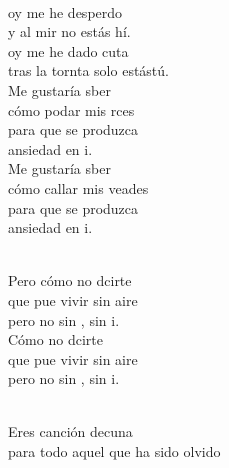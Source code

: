 \documentclass[12pt]{article}
\begin{document}
\begin{multicols*}{2}
\begin{cancion}
                            \\
                        oy me he desperdo\\
                        y al mir no estás hí.\\
                        oy me he dado cuta\\
                        tras la tornta solo estástú.\\
                \jump
                        Me gustaría sber\\
                        cómo podar mis rces \\
                        para que  se produzca\\
                        ansiedad en i.\\
                \jump
                        Me gustaría sber\\
                        cómo callar mis veades\\
                        para que  se produzca \\
                        ansiedad en i.\\\jump\\
                        \begin{chorus}%
                        Pero cómo no dcirte\\
                        que pue vivir sin aire\\
                        pero no sin , sin i.\\
                \jump
                        Cómo no dcirte\\
                        que pue vivir sin aire\\
                        pero no sin , sin i.\\
                        \end{chorus}%
                        \jump\\
                        Eres canción decuna\\
                        para todo aquel que ha sido olvido\\

\end{cancion}
\end{multicols*}
\end{document}
